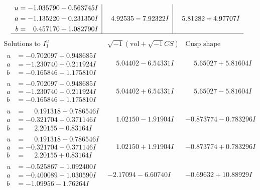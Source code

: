 \documentclass[1p]{elsarticle_modified}
\theoremstyle{definition}
\newcommand{\I}{\sqrt{-1}}
\begin{document}
$$\begin{array}{c|c|c}
\begin{aligned}
u &= -1.035790 - 0.563745 I \\
a &= -1.135220 - 0.231350 I \\
b &= \phantom{-}0.457170 + 1.082790 I\end{aligned}
 & \phantom{-}4.92535 - 7.92322 I & \phantom{-}5.81282 + 4.97707 I\\
 \hline 
 \end{array}$$\newpage$$\begin{array}{c|c|c}  
\text{Solutions to }I^u_{1}& \I (\text{vol} + \sqrt{-1}CS) & \text{Cusp shape}\\
 \hline 
\begin{aligned}
u &= -0.702097 + 0.948685 I \\
a &= -1.230740 + 0.211924 I \\
b &= -0.165846 - 1.175810 I\end{aligned}
 & \phantom{-}5.04402 - 6.54331 I & \phantom{-}5.65027 + 5.81604 I \\ \hline\begin{aligned}
u &= -0.702097 - 0.948685 I \\
a &= -1.230740 - 0.211924 I \\
b &= -0.165846 + 1.175810 I\end{aligned}
 & \phantom{-}5.04402 + 6.54331 I & \phantom{-}5.65027 - 5.81604 I \\ \hline\begin{aligned}
u &= \phantom{-}0.191318 + 0.786546 I \\
a &= -0.321704 + 0.371146 I \\
b &= \phantom{-}2.20155 - 0.83164 I\end{aligned}
 & \phantom{-}1.02150 - 1.91904 I & -0.873774 - 0.783296 I \\ \hline\begin{aligned}
u &= \phantom{-}0.191318 - 0.786546 I \\
a &= -0.321704 - 0.371146 I \\
b &= \phantom{-}2.20155 + 0.83164 I\end{aligned}
 & \phantom{-}1.02150 + 1.91904 I & -0.873774 + 0.783296 I \\ \hline\begin{aligned}
u &= -0.525867 + 1.092400 I \\
a &= -0.400089 + 1.030590 I \\
b &= -1.09956 - 1.76264 I\end{aligned}
 & -2.17094 - 6.60740 I & -0.69632 + 10.88929 I \\ \hline\begin{aligned}

\end{aligned}
\end{array}$$
\end{document}

